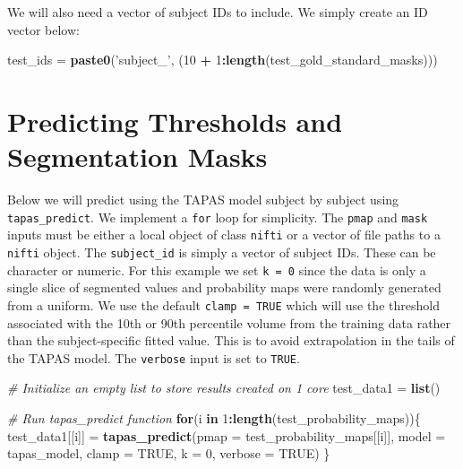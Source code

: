 \documentclass[]{article}
\newenvironment{Shaded}{\begin{snugshade}}{\end{snugshade}}
\newcommand{\CommentTok}[1]{\textcolor[rgb]{0.56,0.35,0.01}{\textit{#1}}}
\newcommand{\ControlFlowTok}[1]{\textcolor[rgb]{0.13,0.29,0.53}{\textbf{#1}}}
\newcommand{\DataTypeTok}[1]{\textcolor[rgb]{0.13,0.29,0.53}{#1}}
\newcommand{\DecValTok}[1]{\textcolor[rgb]{0.00,0.00,0.81}{#1}}
\newcommand{\KeywordTok}[1]{\textcolor[rgb]{0.13,0.29,0.53}{\textbf{#1}}}
\newcommand{\NormalTok}[1]{#1}
\newcommand{\OperatorTok}[1]{\textcolor[rgb]{0.81,0.36,0.00}{\textbf{#1}}}
\newcommand{\OtherTok}[1]{\textcolor[rgb]{0.56,0.35,0.01}{#1}}
\newcommand{\StringTok}[1]{\textcolor[rgb]{0.31,0.60,0.02}{#1}}
\begin{document}
We will also need a vector of subject IDs to include. We simply create
an ID vector below:

\begin{Shaded}
\begin{Highlighting}[]
\NormalTok{test_ids =}\StringTok{ }\KeywordTok{paste0}\NormalTok{(}\StringTok{'subject_'}\NormalTok{, (}\DecValTok{10} \OperatorTok{+}\StringTok{ }\DecValTok{1}\OperatorTok{:}\KeywordTok{length}\NormalTok{(test_gold_standard_masks)))}
\end{Highlighting}
\end{Shaded}

\hypertarget{predicting-thresholds-and-segmentation-masks}{%
\section{Predicting Thresholds and Segmentation
Masks}\label{predicting-thresholds-and-segmentation-masks}}

Below we will predict using the TAPAS model subject by subject using
\texttt{tapas\_predict}. We implement a \texttt{for} loop for
simplicity. The \texttt{pmap} and \texttt{mask} inputs must be either a
local object of class \texttt{nifti} or a vector of file paths to a
\texttt{nifti} object. The \texttt{subject\_id} is simply a vector of
subject IDs. These can be character or numeric. For this example we set
\texttt{k\ =\ 0} since the data is only a single slice of segmented
values and probability maps were randomly generated from a uniform. We
use the default \texttt{clamp\ =\ TRUE} which will use the threshold
associated with the 10th or 90th percentile volume from the training
data rather than the subject-specific fitted value. This is to avoid
extrapolation in the tails of the TAPAS model. The \texttt{verbose}
input is set to \texttt{TRUE}.

\begin{Shaded}
\begin{Highlighting}[]
\CommentTok{# Initialize an empty list to store results created on 1 core}
\NormalTok{test_data1 =}\StringTok{ }\KeywordTok{list}\NormalTok{()}

\CommentTok{# Run tapas_predict function}
\ControlFlowTok{for}\NormalTok{(i }\ControlFlowTok{in} \DecValTok{1}\OperatorTok{:}\KeywordTok{length}\NormalTok{(test_probability_maps))\{}
\NormalTok{  test_data1[[i]] =}\StringTok{ }\KeywordTok{tapas_predict}\NormalTok{(}\DataTypeTok{pmap =}\NormalTok{ test_probability_maps[[i]],}
                                  \DataTypeTok{model =}\NormalTok{ tapas_model,}
                                  \DataTypeTok{clamp =} \OtherTok{TRUE}\NormalTok{,}
                                  \DataTypeTok{k =} \DecValTok{0}\NormalTok{,}
                                  \DataTypeTok{verbose =} \OtherTok{TRUE}\NormalTok{)}
\NormalTok{\}}
\end{Highlighting}
\end{Shaded}
\end{document}
